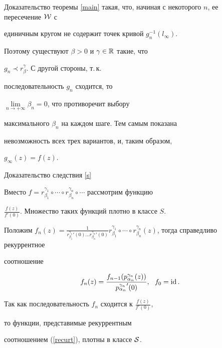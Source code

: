 \begin{pf*}{Доказательство теоремы \ref{main}}
такая, что, начиная с некоторого $n$, ее пересечение $\cal W$ с


единичным кругом не содержит точек кривой $g_n^{-1}(l_\infty)$.


Поэтому существуют $\beta>0$ и $\gamma\in\Bbb R$ такие, что


$g_{n}\prec r_\beta^\gamma$. С другой стороны, т.\,к.


последовательность $g_n$ сходится, то


$\lim\limits_{n\to+\infty}\beta_n=0$, что противоречит выбору


максимального $\beta_n$ на каждом шаге. Тем самым показана


невозможность всех трех вариантов, и, таким образом,


$g_\infty(z)=f(z)$.


\end{pf*}








\begin{pf*}{Доказательство следствия \ref{s}}


Вместо $f=r_{\beta_1}^{\gamma_1}\circ\dotsb\circ


r_{\beta_n}^{\gamma_n}\circ\dotsb$ рассмотрим функцию


$\frac{f(z)}{f'(0)}$. Множество таких функций плотно в классе $S$.


Положим $f_n(z)=\frac1{{r_{\beta_1}^{\gamma_1}}'(0) \dotsc


{r_{\beta_n}^{\gamma_n}}'(0)}r_{\beta_1}^{\gamma_1}\circ\dotsb\circ


r_{\beta_n}^{\gamma_n}(z)$, тогда справедливо рекуррентное


соотношение


\begin{equation}


f_n(z)=\frac{f_{n-1}(p^{\gamma_n}_{\alpha_n}(z))}


{{p_{\alpha_n}^{\gamma_n}}'(0)},\ \ f_0=\id.


\label{recurt}


\end{equation}


Так как последовательность $f_n$ сходится к $\frac{f(z)}{f'(0)}$,


то функции, представимые рекуррентным


соотношением (\ref{recurt}), плотны в классе $\cal S$.


\end{pf*}





